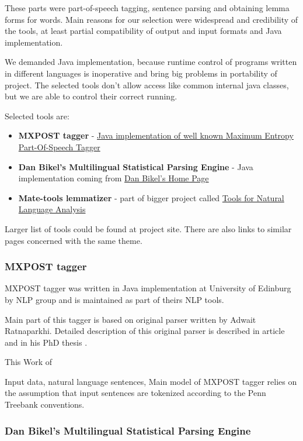 These parts were part-of-speech tagging, sentence parsing and obtaining lemma forms for words. Main reasons for our selection were widespread  and credibility of the tools, at least partial compatibility of output and input formats and Java implementation. 

We demanded Java implementation, because runtime control of programs written in different languages is inoperative and bring big problems in portability of project. The selected tools don't allow access like common internal java classes, but we are able to control their correct running.

Selected tools are:
 
\begin{itemize}
\item {\bf MXPOST tagger} - \href{http://www.inf.ed.ac.uk/resources/nlp/local_doc/MXPOST.html}{Java implementation of well known Maximum Entropy Part-Of-Speech Tagger}
\item {\bf Dan Bikel's Multilingual Statistical Parsing Engine } - Java implementation coming from \href{http://www.cis.upenn.edu/~dbikel/software.html#stat-parser}{Dan Bikel’s Home Page}
\item {\bf Mate-tools lemmatizer} - part of bigger project called \href{http://code.google.com/p/mate-tools/}{Tools for Natural Language Analysis}
\end{itemize}

Larger list of tools could be found at project site. There are also links to similar pages concerned with the same theme. 
          
\subsubsection{MXPOST tagger} 
MXPOST tagger was written in Java implementation at University of Edinburg by NLP group and is maintained as part of theirs NLP tools.
        
Main part of this tagger is based on original parser written by Adwait Ratnaparkhi. Detailed description of this original parser is described in article \cite{Linguistics-ratnaparkhi96} and in his PhD thesis \cite{Linguistics-ratnaparkhi98}. 

This 
Work of 

Input data, natural language sentences, 
Main model of MXPOST tagger relies on the assumption that input sentences are tokenized
according to the Penn Treebank conventions.
  
\subsubsection{Dan Bikel's Multilingual Statistical Parsing Engine}   

